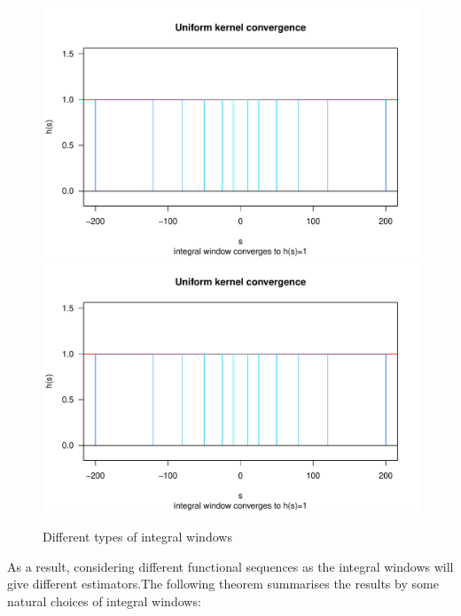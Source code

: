 \documentclass[%
 reprint,
 amsmath,amssymb,
 aps,
]{revtex4-2}
\begin{document}
\begin{figure}
    \centering
    \includegraphics[page = 1, scale = 0.45]{pictures/section 2/integralwindow.pdf}
    \includegraphics[page = 2, scale = 0.45]{pictures/section 2/integralwindow.pdf}
    \caption{Different types of integral windows}
    \label{fig:FI integral windows}
\end{figure}

As a result, considering different functional sequences as the integral windows will give different estimators.The following theorem summarises the results by some natural choices of integral windows:
\end{document}
